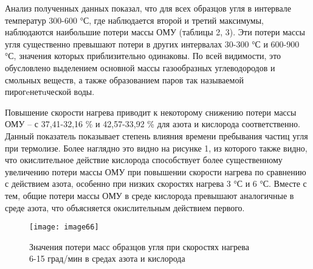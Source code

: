 \begin{multicols}{2}
Анализ полученных данных показал, что для всех образцов угля в интервале
температур 300-600 °С, где наблюдается второй и третий максимумы,
наблюдаются наибольшие потери массы ОМУ (таблицы 2, 3). Эти потери массы
угля существенно превышают потери в других интервалах 30-300 °С и
600-900 °С, значения которых приблизительно одинаковы. По всей
видимости, это обусловлено выделением основной массы газообразных
углеводородов и смольных веществ, а также образованием паров так
называемой пирогeнетuческой воды.

Повышение скорости нагрева приводит к некоторому снижению потери массы
ОМУ -- с 37,41-32,16 \% и 42,57-33,92 \% для азота и кислорода
соответственно. Данный показатель показывает степень влияния времени
пребывания частиц угля при термолизе. Более наглядно это видно на
рисунке 1, из которого также видно, что окислительное действие кислорода
способствует более существенному увеличению потери массы ОМУ при
повышении скорости нагрева по сравнению с действием азота, особенно при
низких скоростях нагрева 3 °С и 6 °С. Вместе с тем, общие потери массы
ОМУ в среде кислорода превышают аналогичные в среде азота, что
объясняется окислительным действием первого.
\end{multicols}

\begin{figure}[H]
\centering
\texttt{[image: image66]}
\caption{Значения потери масс образцов угля при скоростях нагрева\\
6-15 град/мин в средах азота и кислорода}
\end{figure}

